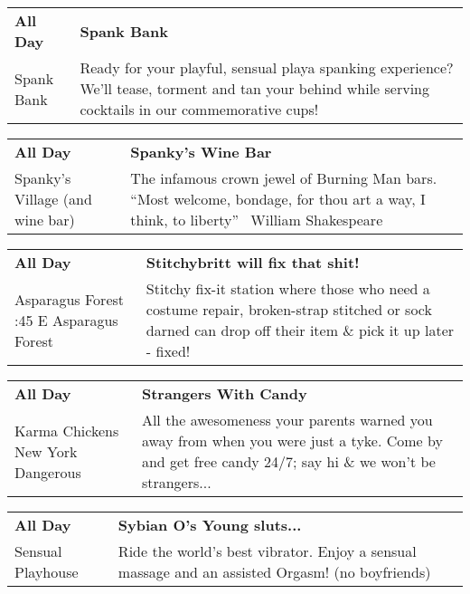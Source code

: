 \begin{tabular}{ p{1in} p{2.2in} }
    \textbf{All Day} & \textbf{Spank Bank} \\
    Spank Bank \newline  & Ready for your playful, sensual playa spanking experience? We'll tease, torment and tan your behind while serving cocktails in our commemorative cups! \\
    \hline 
\end{tabular}
    
\begin{tabular}{ p{1in} p{2.2in} }
    \textbf{All Day} & \textbf{Spanky's Wine Bar} \\
    Spanky's Village (and wine bar) \newline  & The infamous crown jewel of Burning Man bars.  ``Most welcome, bondage, for thou art a way, I think, to liberty''  ~William Shakespeare~ \\
    \hline 
\end{tabular}
    
\begin{tabular}{ p{1in} p{2.2in} }
    \textbf{All Day} & \textbf{Stitchybritt will fix that shit!} \\
    Asparagus Forest \newline 9:45 E Asparagus Forest & Stitchy fix-it station where those who need a costume repair, broken-strap stitched or sock darned can drop off their item \& pick it up later - fixed! \\
    \hline 
\end{tabular}
    
\begin{tabular}{ p{1in} p{2.2in} }
    \textbf{All Day} & \textbf{Strangers With Candy} \\
    Karma Chickens \newline New York Dangerous & All the awesomeness your parents warned you away from when you were just a tyke. Come by and get free candy 24/7; say hi \& we won't be strangers... \\
    \hline 
\end{tabular}
    
\begin{tabular}{ p{1in} p{2.2in} }
    \textbf{All Day} & \textbf{Sybian O's Young sluts...} \\
    Sensual Playhouse \newline  & Ride the world's best vibrator. Enjoy a sensual massage and an assisted Orgasm! (no boyfriends) \\
    \hline 
\end{tabular}
    

